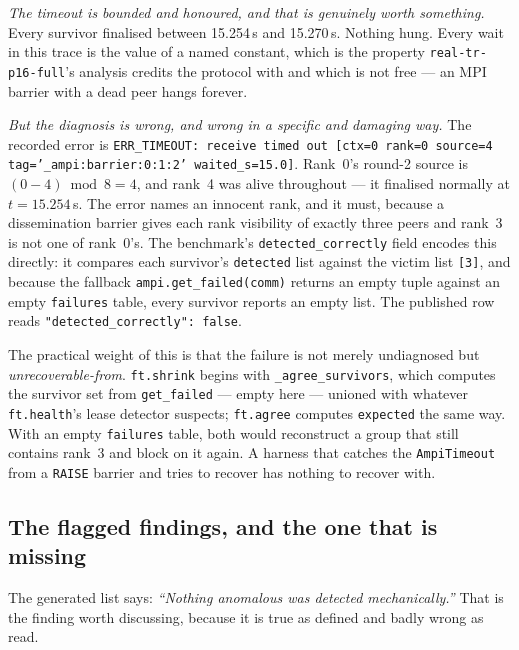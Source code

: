 \documentclass[11pt]{article}
\begin{document}
\emph{The timeout is bounded and honoured, and that is genuinely worth something.} Every
survivor finalised between 15.254\,s and 15.270\,s. Nothing hung. Every wait in this trace
is the value of a named constant, which is the property \texttt{real-tr-p16-full}'s
analysis credits the protocol with and which is not free --- an MPI barrier with a dead
peer hangs forever.

\emph{But the diagnosis is wrong, and wrong in a specific and damaging way.} The recorded
error is
\texttt{ERR\_TIMEOUT: receive timed out [ctx=0 rank=0 source=4 tag='\_ampi:barrier:0:1:2'
waited\_s=15.0]}. Rank~0's round-2 source is $(0 - 4) \bmod 8 = 4$, and rank~4 was alive
throughout --- it finalised normally at $t=15.254$\,s. The error names an innocent rank,
and it must, because a dissemination barrier gives each rank visibility of exactly three
peers and rank~3 is not one of rank~0's. The benchmark's
\texttt{detected\_correctly} field encodes this directly: it compares each survivor's
\texttt{detected} list against the victim list \texttt{[3]}, and because the fallback
\texttt{ampi.get\_failed(comm)} returns an empty tuple against an empty
\texttt{failures} table, every survivor reports an empty list. The published row reads
\texttt{"detected\_correctly": false}.

The practical weight of this is that the failure is not merely undiagnosed but
\emph{unrecoverable-from}. \texttt{ft.shrink} begins with \texttt{\_agree\_survivors},
which computes the survivor set from \texttt{get\_failed} --- empty here --- unioned with
whatever \texttt{ft.health}'s lease detector suspects; \texttt{ft.agree} computes
\texttt{expected} the same way. With an empty \texttt{failures} table, both would
reconstruct a group that still contains rank~3 and block on it again. A harness that
catches the \texttt{AmpiTimeout} from a \texttt{RAISE} barrier and tries to recover has
nothing to recover with.

\subsection{The flagged findings, and the one that is missing}

The generated list says: \emph{``Nothing anomalous was detected mechanically.''} That is
the finding worth discussing, because it is true as defined and badly wrong as read.
\end{document}
